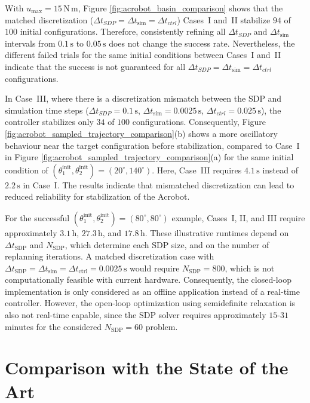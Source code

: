 With $u_{\max}=15\,\mathrm{N\,m}$,
Figure \ref{fig:acrobot_basin_comparison} 
shows that the matched discretization ($\Delta t_{SDP} = \Delta t_{\mathrm{sim}}= \Delta t_{ctrl}$) 
Cases~I and~II stabilize $94$ of $100$ initial configurations.
Therefore, consistently refining all $\Delta t_{SDP}$ and $\Delta t_{\mathrm{sim}}$ intervals from $0.1\,\mathrm{s}$ to $0.05\,\mathrm{s}$
does not change the success rate. Nevertheless,
the different failed trials for the same initial conditions between Cases~I and~II
indicate that the success is not guaranteed for all $\Delta t_{SDP} = \Delta t_{\mathrm{sim}}= \Delta t_{ctrl}$
configurations.

In Case~III, where there is a discretization mismatch 
between the SDP and simulation time steps
($\Delta t_{SDP} = 0.1\,\mathrm{s}$, 
 $\Delta t_{\mathrm{sim}}= 0.0025\,\mathrm{s}$, $\Delta t_{ctrl} = 0.025\,\mathrm{s}$),
the controller stabilizes only $34$ of $100$ configurations.
Consequently, Figure \ref{fig:acrobot_sampled_trajectory_comparison}(b) shows a more oscillatory behaviour
near the target configuration before stabilization, compared to
Case~I in Figure \ref{fig:acrobot_sampled_trajectory_comparison}(a) for the same initial condition of $(\theta_1^{\mathrm{init}},\theta_2^{\mathrm{init}})=(20^\circ,140^\circ)$.
Here, Case~III requires $4.1\,\mathrm{s}$
instead of $2.2\,\mathrm{s}$ in Case~I.
The results indicate that mismatched discretization can lead to 
reduced reliability for stabilization of the Acrobot.

For the successful $(\theta_1^{\mathrm{init}},\theta_2^{\mathrm{init}})=(80^\circ,80^\circ)$ example,
Cases~I, II, and III require approximately $3.1\,\mathrm{h}$,
$27.3\,\mathrm{h}$,
and $17.8\,\mathrm{h}$.
These illustrative runtimes depend on $\Delta t_{\mathrm{SDP}}$ and $N_{\mathrm{SDP}}$,
which determine each SDP size,
and on the number of replanning iterations.
A matched discretization case with $\Delta t_{\mathrm{SDP}} =\Delta t_{\mathrm{sim}}=\Delta t_{\mathrm{ctrl}}=0.0025\,\mathrm{s}$ 
would require $N_{\mathrm{SDP}}=800$, which is not computationally feasible with current hardware.
Consequently, the closed-loop implementation is only considered as an offline application 
instead of a real-time controller. However, the 
open-loop optimization using semidefinite relaxation is also not real-time capable, since the SDP solver requires
approximately $15$-$31$ minutes for the considered $N_{\mathrm{SDP}}=60$ problem.

\section{Comparison with the State of the Art}
\label{sec:comparison_state_of_the_art}

